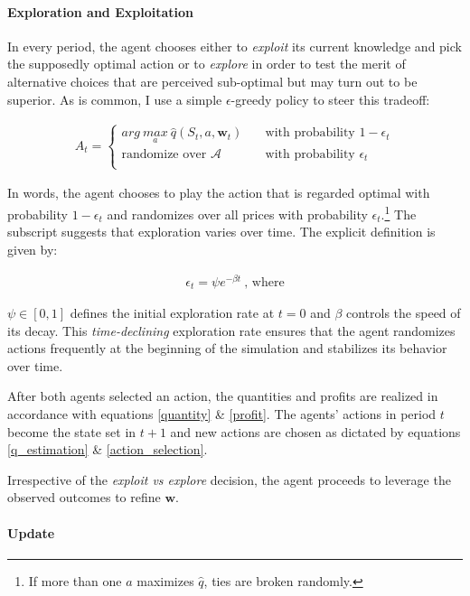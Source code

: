 \paragraph{Exploration and Exploitation} 
In every period, the agent chooses either to \emph{exploit} its current knowledge and pick the supposedly optimal action or to \emph{explore} in order to test the merit of alternative choices that are perceived sub-optimal but may turn out to be superior. As is common, I use a simple $\epsilon$-greedy policy to steer this tradeoff:

\begin{gather}\label{action_selection}
 A_t = \begin{cases} arg ~\underset{a}{max} ~ \hat{q}(S_t,a,\boldsymbol{w}_t) & \quad \text{with probability } 1 - \epsilon_t\\
\text{randomize over } \mathcal{A} & \quad \text{with probability } \epsilon_t\\ \end{cases} 
\end{gather}

In words, the agent chooses to play the action that is regarded optimal with probability $1-\epsilon_t$ and randomizes over all prices with probability $\epsilon_t$.\footnote{If more than one $a$ maximizes $\hat{q}$, ties are broken randomly.} The subscript suggests that exploration varies over time. The explicit definition is given by:

\begin{gather}
	\epsilon_t = \psi e^{-\beta t}~ \text{, where}
\end{gather}

$\psi \in [0, 1]$ defines the initial exploration rate at $t = 0$ and $\beta$ controls the speed of its decay. This \emph{time-declining} exploration rate ensures that the agent randomizes actions frequently at the beginning of the simulation and stabilizes its behavior over time. 

After both agents selected an action, the quantities and profits are realized in accordance with equations \ref{quantity} \& \ref{profit}. The agents' actions in period $t$ become the state set in $t+1$ and new actions are chosen as dictated by equations \ref{q_estimation} \& \ref{action_selection}.

Irrespective of the \emph{exploit vs explore} decision, the agent proceeds to leverage the observed outcomes to refine $\boldsymbol{w}$.



\paragraph{Update}

